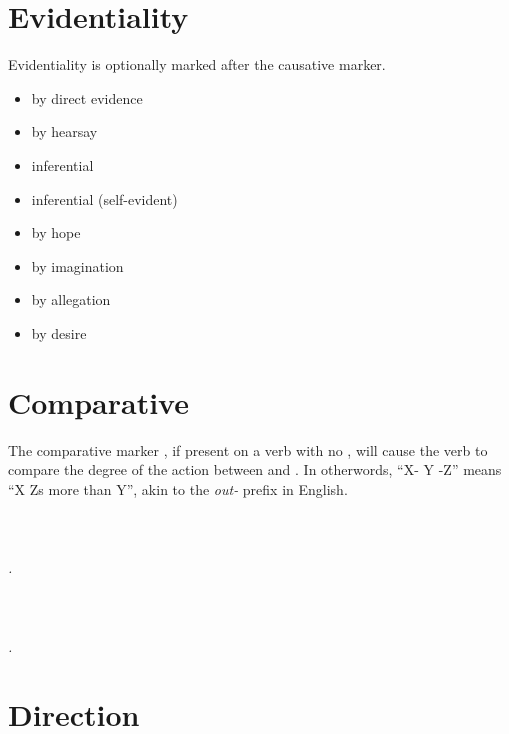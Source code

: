 \documentclass{book}
\begin{document}
\section{Evidentiality}

Evidentiality is optionally marked after the causative marker.

\begin{itemize}
    \item {} by direct evidence
    \item {} by hearsay
    \item {} inferential
    \item {} inferential (self-evident)
    \item {} by hope
    \item {} by imagination
    \item {} by allegation
    \item {} by desire
\end{itemize}

\section{Comparative}

\label{sec:comparative}

The comparative marker , if present on a verb with no , will cause the verb to compare the degree of the action between  and . In otherwords, ``X- Y -Z'' means ``X Zs more than Y'', akin to the \emph{out-} prefix in English. \\
~\\
  \\
  \\
\emph{ .} \\
~\\
   \\
   \\
\emph{   .}

\section{Direction}
\end{document}
